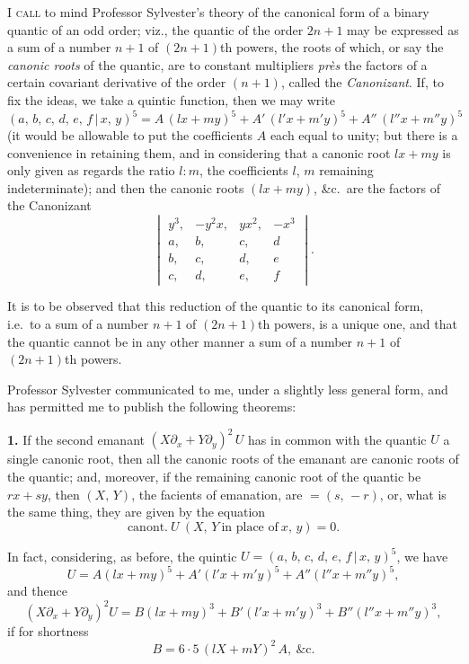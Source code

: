 \documentclass[11pt,a4paper]{article}
\theoremstyle{plain}
\begin{document}
I \textsc{call} to mind Professor Sylvester's theory of the canonical form of a binary quantic of an odd order; viz., the quantic of the order $2n+1$ may be expressed as a sum of a number $n+1$ of $(2n+1)$th powers, the roots of which, or say the \textit{canonic roots} of the quantic, are to constant multipliers \textit{pr\`es} the factors of a certain covariant derivative of the order $(n+1)$, called the \textit{Canonizant}. If, to fix the ideas, we take a quintic function, then we may write
\[
(a,\,b,\,c,\,d,\,e,\,f \,\vert\, x,\,y)^5 = A\,(lx + my)^5 + A'\,(l'x + m'y)^5 + A''\,(l''x + m''y)^5
\]
(it would be allowable to put the coefficients $A$ each equal to unity; but there is a convenience in retaining them, and in considering that a canonic root $lx + my$ is only given as regards the ratio $l : m$, the coefficients $l$, $m$ remaining indeterminate); and then the canonic roots $(lx + my)$, \&c.\ are the factors of the Canonizant
\[
\begin{vmatrix}
y^3, & -y^2 x, & y x^2, & -x^3 \\
a, & b, & c, & d \\
b, & c, & d, & e \\
c, & d, & e, & f
\end{vmatrix}.
\]

It is to be observed that this reduction of the quantic to its canonical form, i.e.\ to a sum of a number $n+1$ of $(2n+1)$th powers, is a unique one, and that the quantic cannot be in any other manner a sum of a number $n+1$ of $(2n+1)$th powers.

\newpage
Professor Sylvester communicated to me, under a slightly less general form, and has permitted me to publish the following theorems:

\medskip

\noindent\textbf{1.} If the second emanant $(X\partial_x + Y\partial_y)^2\,U$ has in common with the quantic $U$ a single canonic root, then all the canonic roots of the emanant are canonic roots of the quantic; and, moreover, if the remaining canonic root of the quantic be $rx + sy$, then $(X,\,Y)$, the facients of emanation, are $=(s,\,-r)$, or, what is the same thing, they are given by the equation
\[
\text{canont.}\ U\ (X,\,Y\ \text{in place of}\ x,\,y) = 0.
\]

In fact, considering, as before, the quintic $U = (a,\,b,\,c,\,d,\,e,\,f \,\vert\, x,\,y)^5$, we have
\[
U = A(lx + my)^5 + A'(l'x + m'y)^5 + A''(l''x + m''y)^5,
\]
and thence
\[
(X\partial_x + Y\partial_y)^2 U = B(lx + my)^3 + B'(l'x + m'y)^3 + B''(l''x + m''y)^3,
\]
if for shortness
\[
B = 6\cdot 5\,(lX + mY)^2\,A,\ \&\text{c.}
\]
\end{document}
